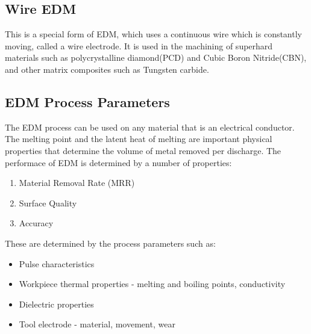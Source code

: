 \subsection{Wire EDM}
This is a special form of EDM, which uses a continuous wire which is constantly moving, called a wire electrode. It is used in the machining of superhard materials such as polycrystalline diamond(PCD) and Cubic Boron Nitride(CBN), and other matrix composites such as Tungsten carbide.

\subsection{EDM Process Parameters}
The EDM process can be used on any material that is an electrical conductor. The melting point and the latent heat of melting are important physical properties that determine the volume of metal removed per discharge.
The performace of EDM is determined by a number of properties\cite{youssef2020non}:
\begin{enumerate}
	\item Material Removal Rate (MRR)
	\item Surface Quality
	\item Accuracy
\end{enumerate}
These are determined by the process parameters such as:
\begin{itemize}
	\item Pulse characteristics
	\item Workpiece thermal properties - melting and boiling points, conductivity
	\item Dielectric properties
	\item Tool electrode - material, movement, wear
\end{itemize}

